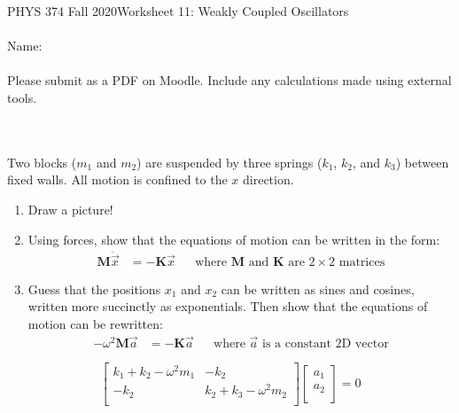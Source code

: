 \documentclass[12pt]{article}
\begin{document}
PHYS 374 Fall 2020\hfill Worksheet 11: Weakly Coupled Oscillators\\
\\
Name:\\
\\
Please submit as a PDF on Moodle. Include any calculations made using external tools.

\hrulefill
\\
\\
Two blocks ($m_1$ and $m_2$) are suspended by three springs ($k_1$, $k_2$, and $k_3$) between fixed walls. All motion is confined to the $x$ direction.
\begin{enumerate}
    \item Draw a picture!
    \item Using forces, show that the equations of motion can be written in the form:
    \begin{align*}
        \mathbf{M} \ddot{\vec{x}} &= - \mathbf{K} \vec{x} &
        &\text{where $\mathbf{M}$ and $\mathbf{K}$ are $2\times2$ matrices}
    \end{align*}
    \item Guess that the positions $x_1$ and $x_2$ can be written as sines and cosines, written more succinctly as exponentials. Then show that the equations of motion can be rewritten:
    \begin{align*}
        -\omega^2 \mathbf{M} \vec{a} &= - \mathbf{K} \vec{a} &
        &\text{where $\vec{a}$ is a constant 2D vector}
    \end{align*}
    
    
    
\end{enumerate}
    


$$
\left[
{\begin{array}{cc}
   k_1 + k_2 - \omega^2 m_1 & -k_2\\
   -k_2 & k_2 + k_3 - \omega^2 m_2\\
  \end{array} }
\right]
\left[
{\begin{array}{c}
    a_1\\
    a_2\\
  \end{array} }
\right]
=0
$$
\end{document}
